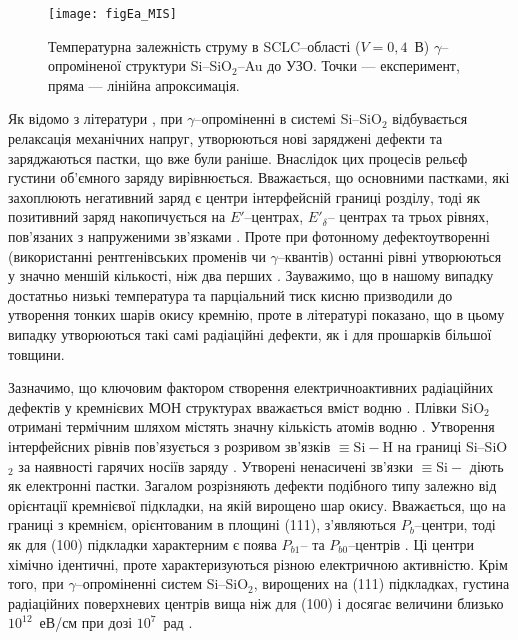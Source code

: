\begin{figure}
\center
\texttt{[image: figEa\_MIS]}%
\caption{\label{figEa_MIS}
Температурна залежність струму в SCLC--області  ($V=0,4$~В)
$\gamma$--опроміненої структури Si--SiO$_2$--Au до УЗО.
Точки --- експеримент,
пряма --- лінійна апроксимація.
}%
\end{figure}

Як відомо з літератури \cite{PersenkovBook}, при $\gamma$--опроміненні в системі Si--SiO$_2$
відбувається релаксація механічних напруг,
утворюються нові заряджені дефекти та заряджаються пастки, що вже були раніше.
Внаслідок цих процесів рельєф густини об'ємного заряду вирівнюється.
Вважається, що основними пастками, які захоплюють негативний заряд є центри інтерфейсній границі розділу,
тоді як позитивний заряд накопичується на $E'$--центрах, $E'_\delta$-- центрах та трьох рівнях, пов'язаних
з напруженими зв'язками \cite{SiO2:Devine,SiO2:Lenahan}.
Проте при фотонному дефектоутворенні (використанні рентгенівських променів чи $\gamma$--квантів) останні рівні утворюються у значно меншій кількості, ніж два перших \cite{SiO2:Devine}.
Зауважимо, що в нашому випадку достатньо низькі температура та парціальний тиск кисню призводили до утворення тонких шарів окису кремнію, проте в літературі \cite{SiO2:Cantin} показано, що в цьому випадку утворюються такі самі радіаційні дефекти, як і для прошарків більшої товщини.

Зазначимо, що ключовим фактором створення електричноактивних радіаційних дефектів у кремнієвих МОН структурах вважається вміст водню \cite{SiO2:Cantin}.
Плівки SiO$_2$ отримані термічним шляхом містять значну кількість атомів водню \cite{PersenkovBook}.
Утворення інтерфейсних рівнів пов'язується з розривом зв'язків $\equiv\!\text{Si}\!-\!\text{H}$ на границі Si--SiO$_2$ за наявності гарячих носіїв заряду \cite{SiO2:Mahapatra,SiO2:Esseni}.
Утворені ненасичені зв'язки $\equiv\text{Si}-$  діють як електронні пастки.
Загалом розрізняють дефекти подібного типу залежно від орієнтації кремнієвої підкладки, на якій вирощено шар окису.
Вважається, що на границі з кремнієм, орієнтованим в площині (111), з'являються $P_b$--центри, тоді
як для (100) підкладки характерним є поява $P_{b1}$-- та $P_{b0}$--центрів \cite{SiO2:Rev}.
Ці центри хімічно ідентичні, проте характеризуються різною електричною активністю.
Крім того, при $\gamma$--опроміненні систем Si--SiO$_2$, вирощених на (111) підкладках, густина радіаційних поверхневих центрів вища ніж для (100) і досягає величини близько $10^{12}$~еВ/см при дозі $10^{7}$~рад \cite{PersenkovBook}.

